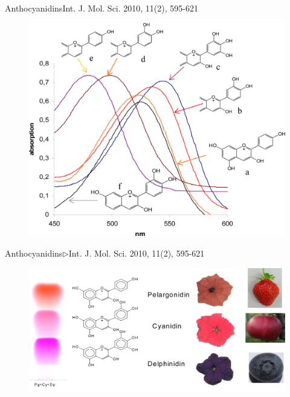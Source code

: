 \documentclass[11pt]{beamer}
\begin{document}
\begin{frame}{Anthocyanidins}{Int. J. Mol. Sci. 2010, 11(2), 595-621}
	\begin{figure}
		\centering
		\includegraphics[scale=0.2]{ijms-11-00595f11.png}
	\end{figure}
\end{frame}
\begin{frame}{Anthocyanidins$\rhd$Int. J. Mol. Sci. 2010, 11(2), 595-621}
	\begin{figure}
		\centering
		\includegraphics[scale=0.3]{ijms-11-00595f13.png}
	\end{figure}
\end{frame}
\end{document}
